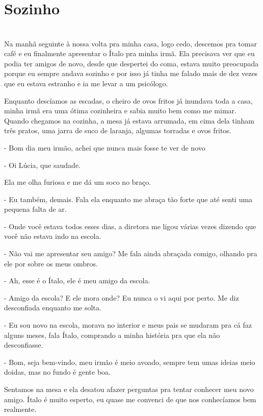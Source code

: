 
\newpage


\ifdefined\useChapters
\chapter{Sozinho}

\else
\chapter{}
\fi


Na manhã seguinte à nossa volta pra minha casa, logo cedo, descemos pra tomar café e eu finalmente apresentar o Ítalo pra minha irmã. Ela precisava ver que eu podia ter amigos de novo, desde que despertei do coma, estava muito preocupada porque eu sempre andava sozinho e por isso já tinha me falado mais de dez vezes que eu estava estranho e ia me levar a um psicólogo.

Enquanto descíamos as escadas, o cheiro de ovos fritos já inundava toda a casa, minha irmã era uma ótima cozinheira e sabia muito bem como me mimar. Quando chegamos na cozinha, a mesa já estava arrumada, em cima dela tinham três pratos, uma jarra de suco de laranja, algumas torradas e ovos fritos.

- Bom dia meu irmão, achei que nunca mais fosse te ver de novo

- Oi Lúcia, que saudade.

Ela me olha furiosa e me dá um soco no braço.

- Eu também, demais. Fala ela enquanto me abraça tão forte que até senti uma pequena falta de ar.

- Onde você estava todos esses dias, a diretora me ligou várias vezes dizendo que você não estava indo na escola.

- Não vai me apresentar seu amigo? Me fala ainda abraçada comigo, olhando pra ele por sobre os meus ombros.

- Ah, esse é o Ítalo, ele é meu amigo da escola.

- Amigo da escola? E ele mora onde? Eu nunca o vi aqui por perto. Me diz desconfiada enquanto me solta.

- Eu sou novo na escola, morava no interior e meus pais se mudaram pra cá faz alguns meses, fala Ítalo, comprando a minha história pra que ela não desconfiasse.

- Bom, seja bem-vindo, meu irmão é meio avoado, sempre tem umas ideias meio doidas, mas no fundo é gente boa.

Sentamos na mesa e ela desatou afazer perguntas pra tentar conhecer meu novo amigo. Ítalo é muito esperto, eu quase me convenci de que nos conhecíamos bem realmente.

